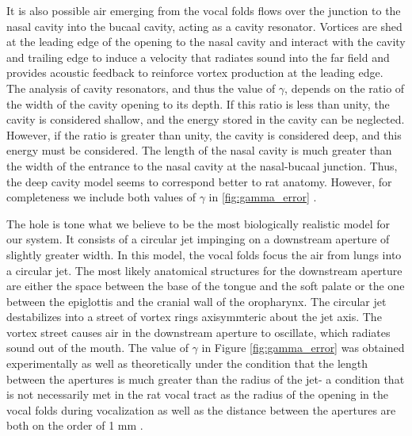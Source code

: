 \documentclass[twocolumn, prl]{revtex4}
\begin{document}
It is also possible air emerging from the vocal folds flows over the junction to the nasal cavity into the bucaal cavity, acting as a cavity resonator. Vortices are shed at the leading edge of the opening to the nasal cavity and interact with the cavity and trailing edge to induce a velocity that radiates sound into the far field and provides acoustic feedback to reinforce vortex production at the leading edge. The analysis of cavity resonators, and thus the value of $\gamma$, depends on the ratio of the width of the cavity opening to its depth. If this ratio is less than unity, the cavity is considered shallow, and the energy stored in the cavity can be neglected. However, if the ratio is greater than unity, the cavity is considered deep, and this energy must be considered. The length of the nasal cavity is much greater than the width of the entrance to the nasal cavity at the nasal-bucaal junction. Thus, the deep cavity model seems to correspond better to rat anatomy. However, for completeness we include both values of $\gamma$ in \ref{fig:gamma_error} \cite{Howe2008, Brudzynski2010}.

The hole is tone what we believe to be the most biologically realistic model for our system. It consists of a circular jet impinging on a downstream aperture of slightly greater width. In this model, the vocal folds focus the air from lungs into a circular jet. The most likely anatomical structures for the downstream aperture are either the space between the base of the tongue and the soft palate or the one between the epiglottis and the cranial wall of the oropharynx. The circular jet destabilizes into a street of vortex rings axisymmteric about the jet axis. The vortex street causes air in the downstream aperture to oscillate, which radiates sound out of the mouth. The value of $\gamma$ in Figure \ref{fig:gamma_error} was obtained experimentally as well as theoretically under the condition that the length between the apertures is much greater than the radius of the jet- a condition that is not necessarily met in the rat vocal tract as the radius of the opening in the vocal folds during vocalization as well as the distance between the apertures are both on the order of 1 mm \cite{Brudzynski2010,Chanaud1965,Howe2008}.
\end{document}
